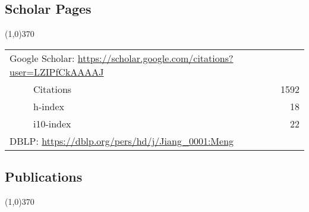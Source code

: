 \documentclass[10pt]{article}
\begin{document}
\vspace{-0.6cm}
\subsection{\sc Scholar Pages}
\vspace{-0.4cm} \line(1,0){370} \vspace{-0.1cm}

\begin{table}[h!]
\begin{tabular*}{12.7cm}{p{11.65cm}r}
\multicolumn{2}{l}{Google Scholar: \url{https://scholar.google.com/citations?user=LZIPfCkAAAAJ}} \\
~~~~~Citations&1592 \\
~~~~~h-index&18 \\
~~~~~i10-index&22 \\
\multicolumn{2}{l}{DBLP: \url{https://dblp.org/pers/hd/j/Jiang\_0001:Meng}} \\
\end{tabular*}
\end{table}

\vspace{-0.6cm}
\subsection{}
\subsection{\sc Publications}
\vspace{-0.4cm} \line(1,0){370} \vspace{-0.1cm}
\end{document}
